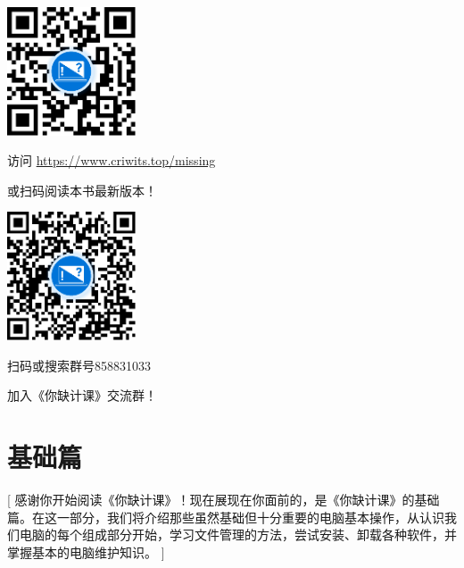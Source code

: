 \documentclass[a4paper]{book}
\begin{document}
\begin{center}
  \vspace*{1cm}
  \begin{minipage}{.45\textwidth}
    \centering
    \vskip0.6cm
    \includegraphics[width=3.8cm]{assets/QR_code.pdf}\par
    \vskip0.6cm
    访问 \url{https://www.criwits.top/missing}\par
    或扫码阅读本书最新版本！\par
  \end{minipage}
  \qquad
  \begin{minipage}{.45\textwidth}
    \centering
    \vskip0.6cm
    \includegraphics[width=3.8cm]{assets/QQ_group.pdf}\par
    \vskip0.6cm
    扫码或搜索群号858831033\par
    加入《你缺计课》交流群！\par
  \end{minipage}
\end{center}  



\tableofcontents

\mainmatter

\part{基础篇}[
  感谢你开始阅读《你缺计课》！现在展现在你面前的，是《你缺计课》的基础篇。在这一部分，我们将介绍那些虽然基础但十分重要的电脑基本操作，从认识我们电脑的每个组成部分开始，学习文件管理的方法，尝试安装、卸载各种软件，并掌握基本的电脑维护知识。
]








\end{document}
